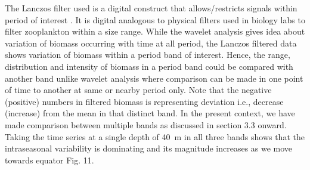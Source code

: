 \documentclass[authoryear,review,12pt]{elsarticle}
\begin{document}
	The Lanczos filter used is a digital construct that allows/restricts signals within period
	of interest \citep{duchon1979lanczos}. It is digital analogous to physical filters used in biology labs to filter zooplankton within a size range. While the wavelet analysis gives idea about variation of biomass occurring with time at all period, the Lanczos filtered data shows variation of biomass within a period band of interest. Hence, the range, distribution and intensity of biomass in a period band could be compared with another band unlike wavelet analysis where comparison can be made in one point of time to another at same or nearby period only. Note that the negative (positive) numbers in filtered biomass is representing deviation i.e., decrease (increase) from the mean in that distinct band. In the present context, we have made comparison between multiple bands as discussed in section 3.3 onward. Taking the time series at a single depth of 40~m in all three bands shows that the intraseasonal variability is dominating and its magnitude increases as we move towards equator Fig. 11.
	
\newpage
\linespread{1}	
\footnotesize 	






\newpage
{} 	
\end{document}
